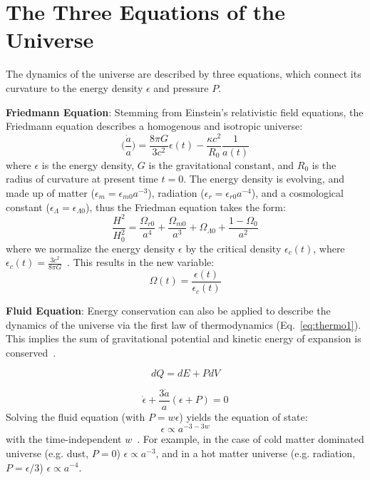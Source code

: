 \section{The Three Equations of the Universe}

The dynamics of the universe are described by three equations, which connect its curvature to the energy density $\epsilon$ and pressure $P$.

\noindent
\textbf{Friedmann Equation}:  Stemming from Einstein's relativistic field equations, the Friedmann equation describes a homogenous and isotropic universe:  
\begin{equation}
    \bigg ( \frac{\Dot{a}}{a} \bigg ) = \frac{8\pi G}{3c^2}\epsilon(t) - \frac{\kappa c^2}{R_0}\frac{1}{a(t)}
\end{equation}
where $\epsilon$ is the energy density, $G$ is the gravitational constant, and $R_0$ is the radius of curvature at present time $t=0$.  The energy density is evolving, and made up of matter ($\epsilon_m=\epsilon_{m0}a^{-3}$), radiation ($\epsilon_r=\epsilon_{r0}a^{-4}$), and a cosmological constant ($\epsilon_{\Lambda}=\epsilon_{\Lambda 0}$), thus the Friedman equation takes the form:
\begin{equation}
    \frac{H^2}{H_0^2} = \frac{\Omega_{r0}}{a^4} + \frac{\Omega_{m0}}{a^3} + \Omega_{\Lambda 0} + \frac{1-\Omega_0}{a^2}
\end{equation}
where we normalize the energy density $\epsilon$ by the critical density $\epsilon_c(t)$, where $\epsilon_c(t) = \frac{3c^2}{8\pi G}$~\cite{ryden_2016}.  This results in the new variable:
\begin{equation}
    \Omega(t) = \frac{\epsilon(t)}{\epsilon_c(t)}
\end{equation}

\noindent
\textbf{Fluid Equation}:  Energy conservation can also be applied to describe the dynamics of the universe via the first law of thermodynamics (Eq.~\ref{eq:thermo1}).  This implies the sum of gravitational potential and kinetic energy of expansion is conserved~\cite{ryden_2016}.

\begin{equation}
    dQ = dE + PdV
    \label{eq:thermo1}
\end{equation}

\begin{equation}
    \dot{\epsilon} + \frac{3\dot{a}}{a}(\epsilon + P) = 0
    \label{eq:fluid_universe}
\end{equation}
\noindent
Solving the fluid equation (with $P=w\epsilon$) yields the equation of state:
\begin{equation}
    \epsilon \propto a^{-3-3w}
\end{equation}
with the time-independent $w$~\cite{weinberg_cosmo}.  For example, in the case of cold matter dominated universe (e.g. dust, $P = 0$) $\epsilon\propto a^{-3}$, and in a hot matter universe (e.g. radiation, $P=\epsilon/3$) $\epsilon\propto a^{-4}$.

